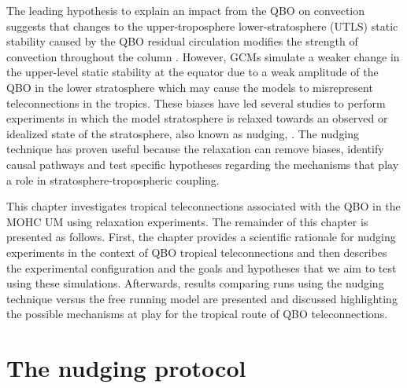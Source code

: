 The leading hypothesis to explain an impact from the QBO on convection suggests that changes to the upper-troposphere lower-stratosphere (UTLS) static stability caused by the QBO residual circulation modifies the strength of convection throughout the column \citep{liess2012,nie2015}. 
   However, GCMs simulate a weaker change in the upper-level static stability at the equator due to a weak amplitude of the QBO in the lower stratosphere \citep{lee2018,richter2020} which may cause the models to misrepresent teleconnections in the tropics.  
 These biases have led several studies to perform experiments in which the model stratosphere is relaxed towards an observed or idealized  state of the stratosphere, also known as nudging, \citep[e.g.][]{garfinkel2011,gray2020,richter2020,martin2021}. 
The nudging technique has proven useful because the relaxation can remove biases, identify causal pathways and test specific hypotheses regarding the mechanisms that play a role in stratosphere-tropospheric coupling. 

This chapter investigates tropical teleconnections associated with the QBO in the MOHC UM using relaxation experiments. The remainder of this chapter is presented as follows. First, the chapter provides a scientific rationale for nudging experiments in the context of QBO tropical teleconnections and then describes the experimental configuration and the goals and hypotheses that we aim to test using these simulations. 
Afterwards, results comparing runs using the nudging technique versus the free running model are presented and discussed highlighting the possible mechanisms at play for the tropical route of QBO teleconnections. 

\section{The nudging protocol}
%

